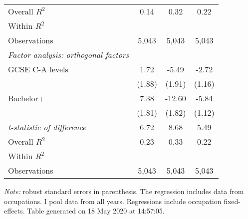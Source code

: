 \begin{center}
\begin{threeparttable}[!h]
\begin{tabular}{lccc}
\midrule Overall $ R^2$&        0.14         &        0.32         &        0.22         \\
Within $ R^2$       &                     &                     &                     \\
Observations        &       5,043         &       5,043         &       5,043         \\
\midrule \vspace{1mm}\textit{Factor analysis: orthogonal factors} \\ 
\hspace{3mm}GCSE C-A levels&        1.72         &       -5.49\sym{**} &       -2.72\sym{*}  \\
                    &      (1.88)         &      (1.91)         &      (1.16)         \\
\hspace{3mm}Bachelor+&        7.38\sym{***}&      -12.60\sym{***}&       -5.84\sym{***}\\
                    &      (1.81)         &      (1.82)         &      (1.12)         \\
\textit{t-statistic of difference}&        6.72         &        8.68         &        5.49         \\
\midrule Overall $ R^2$&        0.23         &        0.33         &        0.22         \\
Within $ R^2$       &                     &                     &                     \\
Observations        &       5,043         &       5,043         &       5,043         \\
\bottomrule
\bottomrule
\end{tabular}
\begin{tablenotes}
\item \footnotesize \textit{Note:} robust standard errors in parenthesis. The regression includes data from occupations. I pool data from all years. Regressions include occupation fixed-effects. Table generated on 18 May 2020 at 14:57:05.
\end{tablenotes}
\end{threeparttable}
\end{center}
